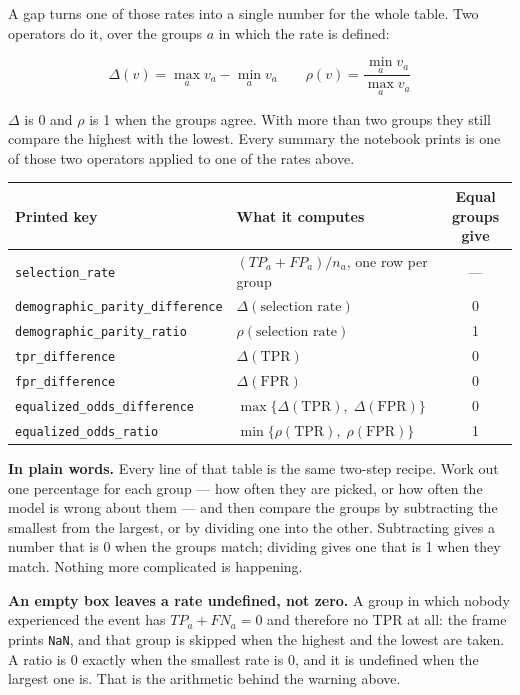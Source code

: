 \documentclass[11pt]{article}
\newcommand{\fn}[1]{\texttt{\small #1}}
\begin{document}
A gap turns one of those rates into a single number for the whole table. Two operators do it, over the groups \(a\) in which the rate is defined:

\[
\Delta(v) = \max_a v_a - \min_a v_a
\qquad
\rho(v) = \frac{\min_a v_a}{\max_a v_a}
\]

\(\Delta\) is 0 and \(\rho\) is 1 when the groups agree. With more than two groups they still compare the highest with the lowest. Every summary the notebook prints is one of those two operators applied to one of the rates above.

\begin{table}[H]
\centering
\small
\begin{tabularx}{\textwidth}{@{}l Y c@{}}
\toprule
Printed key & What it computes & Equal groups give \\
\midrule
\fn{selection\_rate} & \((TP_a + FP_a) / n_a\), one row per group & --- \\
\fn{demographic\_parity\_difference} & \(\Delta(\text{selection rate})\) & 0 \\
\fn{demographic\_parity\_ratio} & \(\rho(\text{selection rate})\) & 1 \\
\fn{tpr\_difference} & \(\Delta(\mathrm{TPR})\) & 0 \\
\fn{fpr\_difference} & \(\Delta(\mathrm{FPR})\) & 0 \\
\fn{equalized\_odds\_difference} & \(\max\{\Delta(\mathrm{TPR}),\; \Delta(\mathrm{FPR})\}\) & 0 \\
\fn{equalized\_odds\_ratio} & \(\min\{\rho(\mathrm{TPR}),\; \rho(\mathrm{FPR})\}\) & 1 \\
\bottomrule
\end{tabularx}
\end{table}

\begin{plainwords}
\textbf{In plain words.} Every line of that table is the same two-step recipe. Work out one percentage for each group --- how often they are picked, or how often the model is wrong about them --- and then compare the groups by subtracting the smallest from the largest, or by dividing one into the other. Subtracting gives a number that is 0 when the groups match; dividing gives one that is 1 when they match. Nothing more complicated is happening.
\end{plainwords}

\begin{careful}
\textbf{An empty box leaves a rate undefined, not zero.} A group in which nobody experienced the event has \(TP_a + FN_a = 0\) and therefore no TPR at all: the frame prints \fn{NaN}, and that group is skipped when the highest and the lowest are taken. A ratio is 0 exactly when the smallest rate is 0, and it is undefined when the largest one is. That is the arithmetic behind the warning above.
\end{careful}
\end{document}
